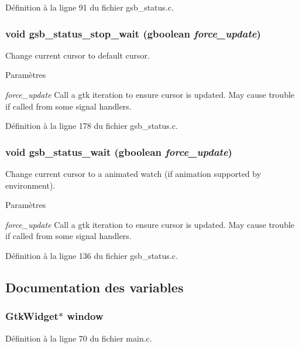 Définition à la ligne 91 du fichier gsb\_\-status.c.

\subsubsection[{gsb\_\-status\_\-stop\_\-wait}]{\setlength{\rightskip}{0pt plus 5cm}void gsb\_\-status\_\-stop\_\-wait (gboolean {\em force\_\-update})}\label{gsb__status_8c_ac4035c7e810531f0bf1264ae3be76c52}
Change current cursor to default cursor.


\begin{DoxyParams}{Paramètres}
\item[{\em force\_\-update}]Call a gtk iteration to ensure cursor is updated. May cause trouble if called from some signal handlers. \end{DoxyParams}


Définition à la ligne 178 du fichier gsb\_\-status.c.

\subsubsection[{gsb\_\-status\_\-wait}]{\setlength{\rightskip}{0pt plus 5cm}void gsb\_\-status\_\-wait (gboolean {\em force\_\-update})}\label{gsb__status_8c_a16da6eed5923c59ba4584c96af26ff41}
Change current cursor to a animated watch (if animation supported by environment).


\begin{DoxyParams}{Paramètres}
\item[{\em force\_\-update}]Call a gtk iteration to ensure cursor is updated. May cause trouble if called from some signal handlers. \end{DoxyParams}


Définition à la ligne 136 du fichier gsb\_\-status.c.



\subsection{Documentation des variables}
\subsubsection[{window}]{\setlength{\rightskip}{0pt plus 5cm}GtkWidget$\ast$ {\bf window}}\label{gsb__status_8c_a3d346c08cf2d67c388caabffb412b293}


Définition à la ligne 70 du fichier main.c.

